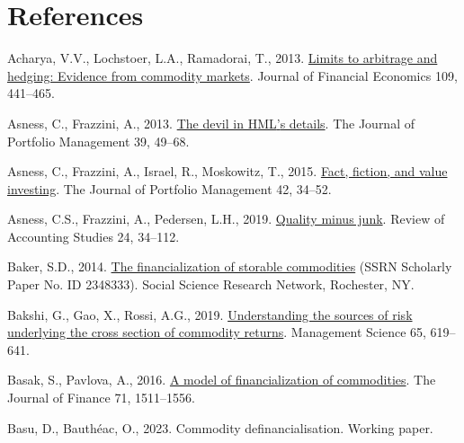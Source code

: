 \documentclass[]{elsarticle} %
\newlength{\cslhangindent}
\newlength{\cslentryspacingunit} %
\newenvironment{CSLReferences}[2] %
 {%
  \setlength{\parindent}{0pt}
  \ifodd #1
  \let\oldpar\par
  \def\par{\hangindent=\cslhangindent\oldpar}
  \fi
  \setlength{\parskip}{#2\cslentryspacingunit}
 }%
 {}
\begin{document}
\restoregeometry\newpage

\hypertarget{references}{%
\section*{References}\label{references}}

\hypertarget{refs}{}
\begin{CSLReferences}{1}{0}
\leavevmode{}%
Acharya, V.V., Lochstoer, L.A., Ramadorai, T., 2013. \href{https://doi.org/10.1016/j.jfineco.2013.03.003}{Limits to arbitrage and hedging: Evidence from commodity markets}. Journal of Financial Economics 109, 441--465.

\leavevmode{}%
Asness, C., Frazzini, A., 2013. \href{https://doi.org/10.3905/jpm.2013.39.4.049}{The devil in HML{'}s details}. The Journal of Portfolio Management 39, 49--68.

\leavevmode{}%
Asness, C., Frazzini, A., Israel, R., Moskowitz, T., 2015. \href{https://doi.org/10.3905/jpm.2015.42.1.034}{Fact, fiction, and value investing}. The Journal of Portfolio Management 42, 34--52.

\leavevmode{}%
Asness, C.S., Frazzini, A., Pedersen, L.H., 2019. \href{https://doi.org/10.1007/s11142-018-9470-2}{Quality minus junk}. Review of Accounting Studies 24, 34--112.

\leavevmode{}%
Baker, S.D., 2014. \href{https://doi.org/10.2139/ssrn.2348333}{The financialization of storable commodities} (SSRN Scholarly Paper No. ID 2348333). Social Science Research Network, Rochester, NY.

\leavevmode{}%
Bakshi, G., Gao, X., Rossi, A.G., 2019. \href{https://doi.org/10.1287/mnsc.2017.2840}{Understanding the sources of risk underlying the cross section of commodity returns}. Management Science 65, 619--641.

\leavevmode{}%
Basak, S., Pavlova, A., 2016. \href{https://doi.org/10.1111/jofi.12408}{A model of financialization of commodities}. The Journal of Finance 71, 1511--1556.

\leavevmode{}%
Basu, D., Bauthéac, O., 2023. Commodity definancialisation. Working paper.


\end{CSLReferences}
\end{document}
